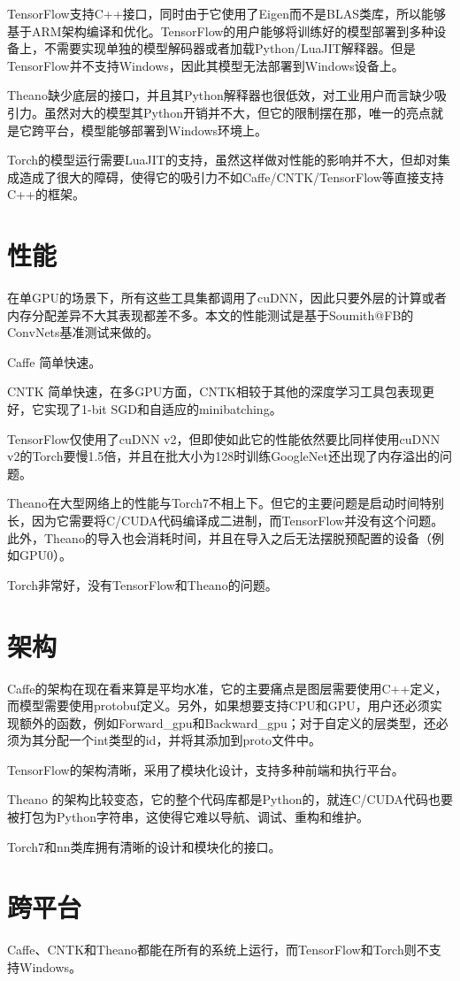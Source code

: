 TensorFlow支持C++接口，同时由于它使用了Eigen而不是BLAS类库，所以能够基于ARM架构编译和优化。TensorFlow的用户能够将训练好的模型部署到多种设备上，不需要实现单独的模型解码器或者加载Python/LuaJIT解释器。但是TensorFlow并不支持Windows，因此其模型无法部署到Windows设备上。

Theano缺少底层的接口，并且其Python解释器也很低效，对工业用户而言缺少吸引力。虽然对大的模型其Python开销并不大，但它的限制摆在那，唯一的亮点就是它跨平台，模型能够部署到Windows环境上。

Torch的模型运行需要LuaJIT的支持，虽然这样做对性能的影响并不大，但却对集成造成了很大的障碍，使得它的吸引力不如Caffe/CNTK/TensorFlow等直接支持C++的框架。

\section{性能}

在单GPU的场景下，所有这些工具集都调用了cuDNN，因此只要外层的计算或者内存分配差异不大其表现都差不多。本文的性能测试是基于Soumith@FB的ConvNets基准测试来做的。

Caffe 简单快速。

CNTK 简单快速，在多GPU方面，CNTK相较于其他的深度学习工具包表现更好，它实现了1-bit SGD和自适应的minibatching。

TensorFlow仅使用了cuDNN v2，但即使如此它的性能依然要比同样使用cuDNN v2的Torch要慢1.5倍，并且在批大小为128时训练GoogleNet还出现了内存溢出的问题。

Theano在大型网络上的性能与Torch7不相上下。但它的主要问题是启动时间特别长，因为它需要将C/CUDA代码编译成二进制，而TensorFlow并没有这个问题。此外，Theano的导入也会消耗时间，并且在导入之后无法摆脱预配置的设备（例如GPU0）。

Torch非常好，没有TensorFlow和Theano的问题。

\section{架构}
Caffe的架构在现在看来算是平均水准，它的主要痛点是图层需要使用C++定义，而模型需要使用protobuf定义。另外，如果想要支持CPU和GPU，用户还必须实现额外的函数，例如Forward\_gpu和Backward\_gpu；对于自定义的层类型，还必须为其分配一个int类型的id，并将其添加到proto文件中。

TensorFlow的架构清晰，采用了模块化设计，支持多种前端和执行平台。

Theano 的架构比较变态，它的整个代码库都是Python的，就连C/CUDA代码也要被打包为Python字符串，这使得它难以导航、调试、重构和维护。

Torch7和nn类库拥有清晰的设计和模块化的接口。

\section{跨平台}
Caffe、CNTK和Theano都能在所有的系统上运行，而TensorFlow和Torch则不支持Windows。
